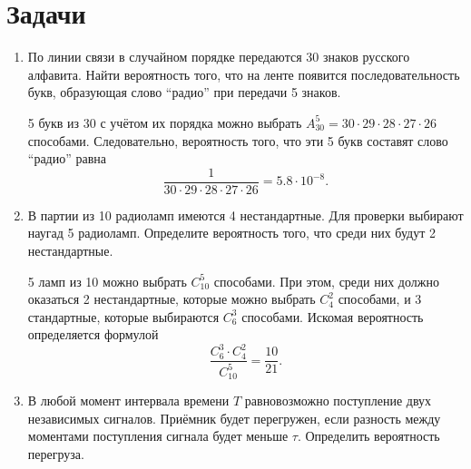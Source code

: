 \section{Задачи}
\begin{enumerate}
    \item По линии связи в случайном порядке передаются 30 знаков русского
        алфавита. Найти вероятность того, что на ленте появится
        последовательность букв, образующая слово ``радио'' при передачи 5
        знаков.

        5 букв из 30 с учётом их порядка можно выбрать
        \( A_{30}^{5} = 30\cdot29\cdot28\cdot27\cdot26 \) способами.
        Следовательно, вероятность того, что эти 5 букв составят слово ``радио''
        равна
        \[
            \frac{1}{30\cdot29\cdot28\cdot27\cdot26} = 5.8\cdot10^{-8}.
        \]
    \item В партии из 10 радиоламп имеются 4 нестандартные. Для проверки
        выбирают наугад 5 радиоламп. Определите вероятность того, что среди них
        будут 2 нестандартные.

        5 ламп из 10 можно выбрать \( C_{10}^5 \) способами. При этом, среди них
        должно оказаться 2 нестандартные, которые можно выбрать \( C_4^2 \)
        способами, и 3 стандартные, которые выбираются \( C_6^3 \) способами.
        Искомая вероятность определяется формулой
        \[
            \frac{C_6^3 \cdot C_4^2}{C_{10}^5} = \frac{10}{21}.
        \]
    \item В любой момент интервала времени \( T \) равновозможно поступление
        двух независимых сигналов. Приёмник будет перегружен, если разность
        между моментами поступления сигнала будет меньше \( \tau \). Определить
        вероятность перегруза.
        \begin{figure}[h]
        \begin{center}
        \end{center}
        \end{figure}


\end{enumerate}
